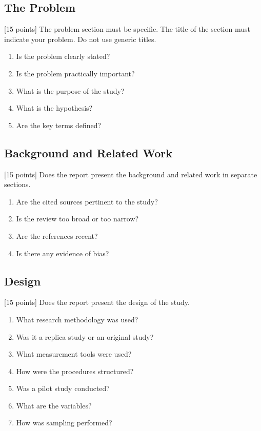 \documentclass{winslabreport}
\begin{document}
\subsection{The Problem}
[15 points] The problem section must be specific. The title of the section must indicate your problem. Do not use generic titles.

\begin{enumerate}
    \item Is the problem clearly stated?
    \item Is the problem practically important?
    \item What is the purpose of the study?
    \item What is the hypothesis?
    \item Are the key terms defined?
\end{enumerate}


\subsection{Background and Related Work}
[15 points] Does the report present the background and related work in separate sections.

\begin{enumerate}
    \item Are the cited sources pertinent to the study?
    \item Is the review too broad or too narrow?
    \item Are the references recent?
    \item Is there any evidence of bias?
\end{enumerate}

\subsection{Design}
[15 points] Does the report present the design of the study.
\begin{enumerate}
    \item What research methodology was used?
    \item Was it a replica study or an original study?
    \item What measurement tools were used?
    \item How were the procedures structured?
    \item Was a pilot study conducted?
    \item What are the variables?
    \item How was sampling performed?
\end{enumerate}
\end{document}
